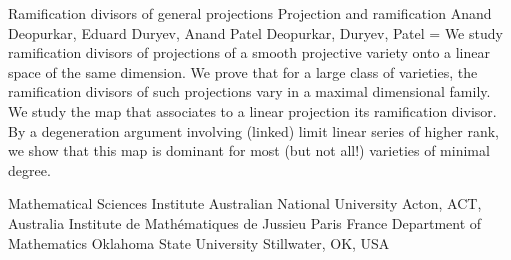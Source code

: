 \documentclass[10pt,a4paper,twoside]{article}
\numberwithin{equation}{section}
\def\TSkip{\bigskip}
\def\Abstract{\begingroup\narrower
    \parskip=\medskipamount\parindent=0pt{\caps Abstract. }}
\def\EndAbstract{\par\endgroup\TSkip}
\begin{document}
\Title Ramification divisors of general projections
\ShortTitle Projection and ramification
\SubTitle   
\Author
Anand Deopurkar, Eduard Duryev, Anand Patel
\ShortAuthor Deopurkar, Duryev, Patel
\EndTitle
\Abstract 
  We study ramification divisors of projections of a smooth projective variety onto a linear space of the same dimension.
  We prove that for a large class of varieties, the ramification divisors of such projections vary in a maximal dimensional family.
  We study the map that associates to a linear projection its ramification divisor.
  By a degeneration argument involving (linked) limit linear series of higher rank, we show that this map is dominant for most (but not all!) varieties of minimal degree. 
\EndAbstract
\MSC 
\EndMSC
\KEY 
\EndKEY
\Address 
Mathematical Sciences Institute
Australian National University
Acton, ACT, Australia
\Address
Institute de Math\'ematiques de Jussieu
Paris
France
\Address
Department of Mathematics
Oklahoma State University
Stillwater, OK, USA
\Address
\EndAddress



\Addresses
\end{document}
